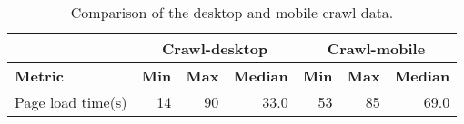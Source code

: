 \begin{table}[ht] 
\caption{Comparison of the desktop and mobile crawl data.} 
\centering 
\begin{tabular}{|l|rrl|lll|} 
\hline 
\textbf{} & \multicolumn{3}{c|}{\textbf{Crawl-desktop}} & \multicolumn{3}{c|}{\textbf{Crawl-mobile}} \\ \hline 
\textbf{Metric} & \multicolumn{1}{r|}{\textbf{Min}} & \multicolumn{1}{r|}{\textbf{Max}} & \textbf{Median} & \multicolumn{1}{l|}{\textbf{Min}} & \multicolumn{1}{l|}{\textbf{Max}} & \textbf{Median} \\ \hline 
Page load time(s) & \multicolumn{1}{r|}{14} & \multicolumn{1}{r|}{90} & \multicolumn{1}{r|}{33.0} & \multicolumn{1}{r|}{53} & \multicolumn{1}{r|}{85} & \multicolumn{1}{r|}{69.0} \\ \hline 
\end{tabular} 
\label{table:Comparison} 
\end{table}